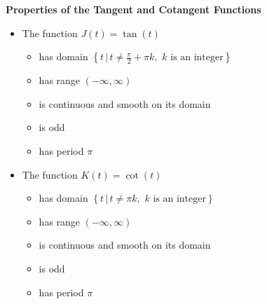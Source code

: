 \documentclass{ximera}
\begin{document}

\begin{theorem} \label{tangentcotangentfunctionprops}  \textbf{Properties of the Tangent and Cotangent Functions}  

\begin{itemize}

\item  The function $J(t) = \tan(t)$

\begin{itemize}


\item has domain $\left\{ t \, | \, t \neq \frac{\pi}{2} + \pi k, \, \,  \text{$k$ is an integer} \right\}$

\item has range $(-\infty, \infty)$

\item is continuous and smooth on its domain

\item is odd

\item has period $\pi$

\end{itemize}

\item  The function $K(t) = \cot(t)$

\begin{itemize}

\item has domain $\left\{ t \, | \, t \neq \pi  k, \, \,  \text{$k$ is an integer} \right\}$

\item has range $(-\infty, \infty)$

\item is continuous and smooth on its domain

\item is odd

\item has period $\pi$



\end{itemize}

\end{itemize}

\end{theorem}

\end{document}
